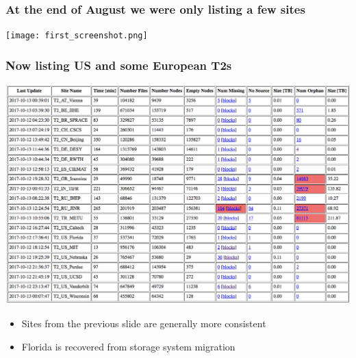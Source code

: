 \documentclass{beamer}
\begin{document}
\begin{frame}
  \frametitle{At the end of August we were only listing a few sites}

  \texttt{[image: first\_screenshot.png]}

\end{frame}

\begin{frame}
  \frametitle{Now listing US and some European T2s}

  \includegraphics[width=\linewidth]{table.png}

  \begin{itemize}
  \item Sites from the previous slide are generally more consistent
  \item Florida is recovered from storage system migration
  \end{itemize}

\end{frame}
\end{document}
